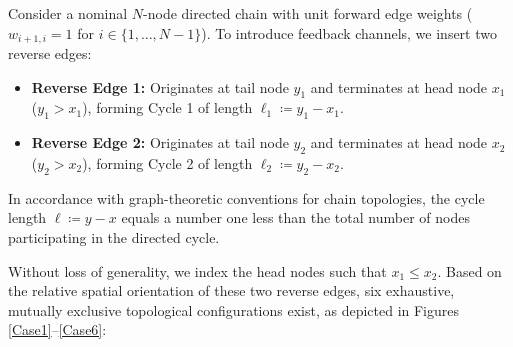 Consider a nominal $N$-node directed chain with unit forward edge weights ($w_{i+1, i} = 1$ for $i \in \{1, \dots, N-1\}$). To introduce feedback channels, we insert two reverse edges:
\begin{itemize}
	\item \textbf{Reverse Edge 1:} Originates at tail node $y_1$ and terminates at head node $x_1$ ($y_1 > x_1$), forming Cycle 1 of length $\ell_1 \coloneqq y_1 - x_1$.
	\item \textbf{Reverse Edge 2:} Originates at tail node $y_2$ and terminates at head node $x_2$ ($y_2 > x_2$), forming Cycle 2 of length $\ell_2 \coloneqq y_2 - x_2$.
\end{itemize}

\begin{remark}\label{rem:ch_TRE_cyclelengthdef}
In accordance with graph-theoretic conventions for chain topologies, the cycle length $\ell \coloneqq y - x$ equals a number one less than the total number of nodes participating in the directed cycle.
\end{remark}

Without loss of generality, we index the head nodes such that $x_1 \le x_2$. Based on the relative spatial orientation of these two reverse edges, six exhaustive, mutually exclusive topological configurations exist, as depicted in Figures \ref{Case1}–\ref{Case6}:

